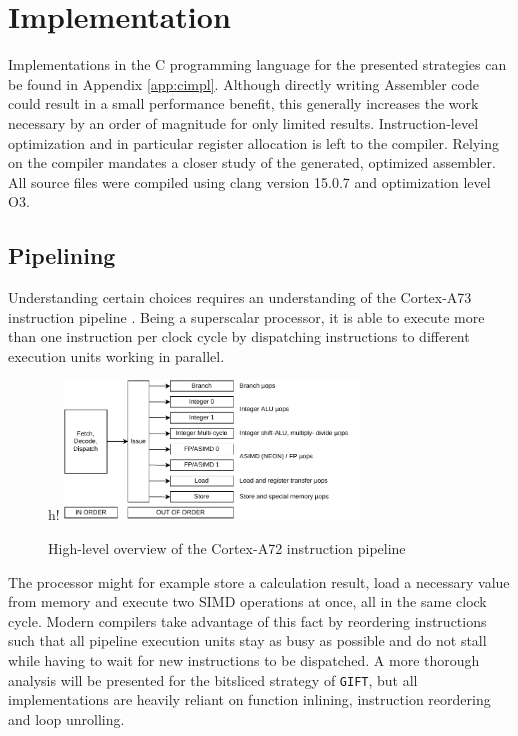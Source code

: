 \chapter{Implementation}

Implementations in the C programming language for the presented strategies can
be found in Appendix \ref{app:cimpl}. Although directly writing Assembler code
could result in a small performance benefit, this generally increases the work
necessary by an order of magnitude for only limited results. Instruction-level
optimization and in particular register allocation is left to the compiler.
Relying on the compiler mandates a closer study of the generated, optimized
assembler. All source files were compiled using clang version 15.0.7 and
optimization level O3.

\section{Pipelining}

Understanding certain choices requires an understanding of the Cortex-A73
instruction pipeline \cite{a72opt:2015}. Being a superscalar processor, it is
able to execute more than one instruction per clock cycle by dispatching
instructions to different execution units working in parallel.

\begin{figure}{h!}
    \centering
    \includegraphics[width=0.7\textwidth]{Figures/a72pipeline.pdf}
    \caption{High-level overview of the Cortex-A72 instruction pipeline}
\end{figure}

The processor might for example store a calculation result, load a necessary
value from memory and execute two SIMD operations at once, all in the same
clock cycle. Modern compilers take advantage of this fact by reordering
instructions such that all pipeline execution units stay as busy as possible
and do not stall while having to wait for new instructions to be dispatched. A
more thorough analysis will be presented for the bitsliced strategy of
\texttt{GIFT}, but all implementations are heavily reliant on function
inlining, instruction reordering and loop unrolling.

